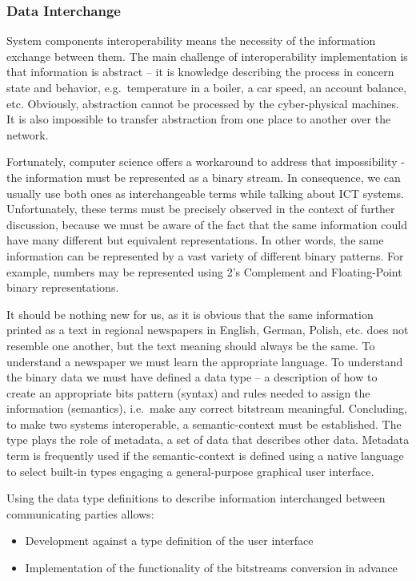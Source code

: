 \documentclass{jacsart}
\providecommand{\tightlist} { \setlength{\itemsep}{0pt}\setlength{\parskip}{0pt}}
\begin{document}
\hypertarget{data-interchange}{%
\subsubsection{Data Interchange}\label{data-interchange}}

System components interoperability means the necessity of the
information exchange between them. The main challenge of
interoperability implementation is that information is abstract -- it is
knowledge describing the process in concern state and behavior,
e.g.~temperature in a boiler, a car speed, an account balance, etc.
Obviously, abstraction cannot be processed by the cyber-physical
machines. It is also impossible to transfer abstraction from one place
to another over the network.

Fortunately, computer science offers a workaround to address that
impossibility - the information must be represented as a binary stream.
In consequence, we can usually use both ones as interchangeable terms
while talking about ICT systems. Unfortunately, these terms must be
precisely observed in the context of further discussion, because we must
be aware of the fact that the same information could have many different
but equivalent representations. In other words, the same information can
be represented by a vast variety of different binary patterns. For
example, numbers may be represented using 2's Complement and
Floating-Point binary representations.

It should be nothing new for us, as it is obvious that the same
information printed as a text in regional newspapers in English, German,
Polish, etc. does not resemble one another, but the text meaning should
always be the same. To understand a newspaper we must learn the
appropriate language. To understand the binary data we must have defined
a data type -- a description of how to create an appropriate bits
pattern (syntax) and rules needed to assign the information (semantics),
i.e.~make any correct bitstream meaningful. Concluding, to make two
systems interoperable, a semantic-context must be established. The type
plays the role of metadata, a set of data that describes other data.
Metadata term is frequently used if the semantic-context is defined
using a native language to select built-in types engaging a
general-purpose graphical user interface.

Using the data type definitions to describe information interchanged
between communicating parties allows:

\begin{itemize}
\tightlist
\item
  Development against a type definition of the user interface
\item
  Implementation of the functionality of the bitstreams conversion in
  advance
\end{itemize}
\end{document}
